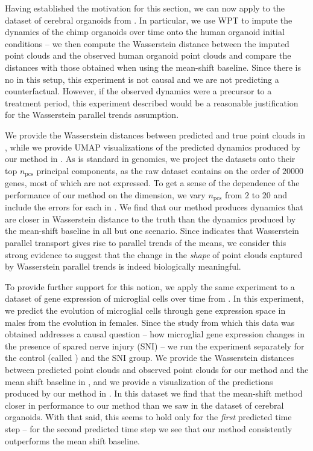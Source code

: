 \documentclass[11pt]{article}
\begin{document}
Having established the motivation for this section, we can now apply  to the dataset of cerebral organoids from \citet{kanton2019organoid}. In particular, we use WPT to impute the dynamics of the chimp organoids over time onto the human organoid initial conditions -- we then compute the Wasserstein distance between the imputed point clouds and the observed human organoid point clouds and compare the distances with those obtained when using the mean-shift baseline. Since there is no  in this setup, this experiment is not causal and we are not predicting a counterfactual. However, if the observed dynamics were a precursor to a treatment period, this experiment described would be a reasonable justification for the Wasserstein parallel trends assumption. 

We provide the Wasserstein distances between predicted and true point clouds in , while we provide UMAP visualizations of the predicted dynamics produced by our method in  \citep{mcinnes2018umap}. As is standard in genomics, we project the datasets onto their top $n_{\text{pcs}}$ principal components, as the raw dataset contains on the order of $20000$ genes, most of which are not expressed. To get a sense of the dependence of the performance of our method on the dimension, we vary $n_{\text{pcs}}$ from $2$ to $20$ and include the errors for each in . We find that our method produces dynamics that are closer in Wasserstein distance to the truth than the dynamics produced by the mean-shift baseline in all but one scenario. Since  indicates that Wasserstein parallel transport gives rise to parallel trends of the means, we consider this strong evidence to suggest that the change in the \textit{shape} of point clouds captured by Wasserstein parallel trends is indeed biologically meaningful.

To provide further support for this notion, we apply the same experiment to a dataset of gene expression of microglial cells over time from \citet{tansley2022single}. In this experiment, we predict the evolution of microglial cells through gene expression space in males from the evolution in females. Since the study from which this data was obtained addresses a causal question -- how microglial gene expression changes in the presence of spared nerve injury (SNI) -- we run the experiment separately for the control (called ) and the SNI group. We provide the Wasserstein distances between predicted point clouds and observed point clouds for our method and the mean shift baseline in , and we provide a visualization of the predictions produced by our method in . In this dataset we find that the mean-shift method closer in performance to our method than we saw in the dataset of cerebral organoids. With that said, this seems to hold only for the \textit{first} predicted time step -- for the second predicted time step we see that our method consistently outperforms the mean shift baseline.
\end{document}
